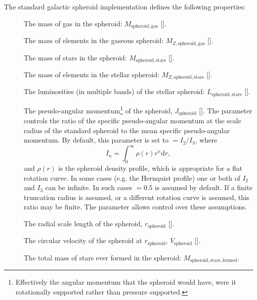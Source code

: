 The standard galactic spheroid implementation defines the following properties:
\begin{description}
 \item [] The mass of gas in the spheroid: $M_\mathrm{spheroid, gas}$ [].
 \item [] The mass of elements in the gaseous spheroid: $M_{Z, \mathrm{spheroid, gas}}$ [].
 \item [] The mass of stars in the spheroid: $M_\mathrm{spheroid, stars}$ [].
 \item [] The mass of elements in the stellar spheroid: $M_{Z, \mathrm{spheroid, stars}}$ [].
 \item [] The luminosities (in multiple bands) of the stellar spheroid: $L_\mathrm{spheroid, stars}$ [].
 \item [] The pseudo-angular momentum\footnote{Effectively the angular momentum that the spheroid would have, were it rotationally supported rather than pressure supported.} of the spheroid, $J_\mathrm{spheroid}$ []. The parameter \mono{[spheroidAngularMomentumAtScaleRadius]} controls the ratio of the specific pseudo-angular momentum at the scale radius of the standard spheroid to the mean specific pseudo-angular momentum. By default, this parameter is set to \mono{[spheroidAngularMomentumAtScaleRadius]} $= I_2/I_3$, where
\begin{equation}
I_n = \int_0^\infty \rho(r) r^n \mathrm{d}r,
\end{equation}
and $\rho(r)$ is the spheroid density profile, which is appropriate for a flat rotation curve. In some cases (e.g. the Hernquist profile) one or both of $I_2$ and $I_3$ can be infinite. In such cases \mono{[spheroidAngularMomentumAtScaleRadius]} $=0.5$ is assumed by default. If a finite truncation radius is assumed, or a different rotation curve is assumed, this ratio may be finite. The \mono{[spheroidAngularMomentumAtScaleRadius]} parameter allows control over these assumptions.
 \item [] The radial scale length of the spheroid, $r_\mathrm{spheroid}$ [].
 \item [] The circular velocity of the spheroid at $r_\mathrm{spheroid}$, $V_\mathrm{spheroid}$ [].
 \item [] The total mass of stars ever formed in the spheroid: $M_\mathrm{spheroid, stars, formed}$.
\end{description}
